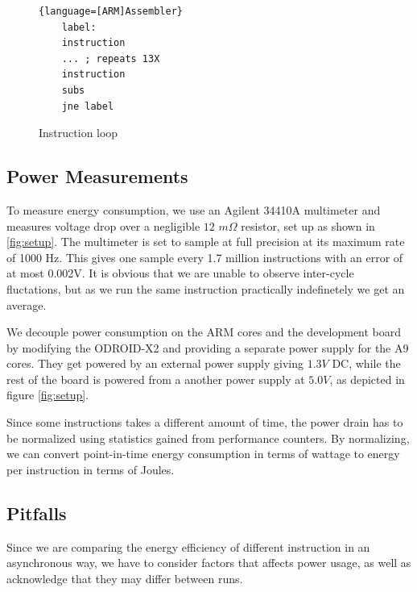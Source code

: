 \begin{figure}
    \begin{lstlisting}{language=[ARM]Assembler}
    label:
    instruction
    ... ; repeats 13X
    instruction
    subs
    jne label
    \end{lstlisting}
    \caption{Instruction loop}
    \label{list:inst_loop}
\end{figure}


\subsection{Power Measurements}
To measure energy consumption, we use an Agilent 34410A
multimeter\cite{agilent34410a} and measures voltage drop over a negligible $12$
$m\Omega$ resistor, set up as shown in \autoref{fig:setup}. The multimeter is
set to sample at full precision at its maximum rate of 1000 Hz. This gives one
sample every 1.7 million instructions with an error of at most 0.002V. It is
obvious that we are unable to observe inter-cycle fluctations, but as we run the
same instruction practically indefinetely we get an average.

We decouple power consumption on the ARM cores and the development board by
modifying the ODROID-X2 and providing a separate power supply for the A9 cores.
They get powered by an external power supply giving $1.3V$ DC, while the rest of
the board is powered from a another power supply at $5.0V$, as depicted in
figure \ref{fig:setup}.

Since some instructions takes a different amount of time, the power drain has to
be normalized using statistics gained from performance counters. By normalizing,
we can convert point-in-time energy consumption in terms of wattage to energy
per instruction in terms of Joules.


\subsection{Pitfalls}
Since we are comparing the energy efficiency of different instruction in an
asynchronous way, we have to consider factors that affects power usage, as well
as acknowledge that they may differ between runs.

